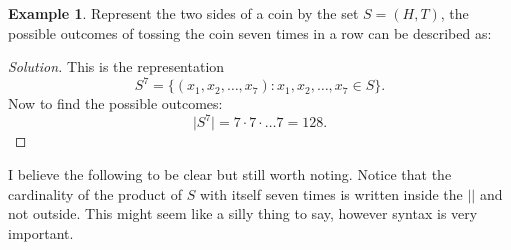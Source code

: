 \documentclass{article}
\theoremstyle{definition}
\newtheorem{example}{Example}[subsection]
\newenvironment{solution}
    {\begin{proof}[Solution]}
    {\end{proof}}
\begin{document}
\begin{example}
    Represent the two sides of a coin by the set $S=(H,T)$, the possible outcomes of tossing the coin seven times in a row can be described as: 
    \begin{solution}
        This is the representation
        $$
        S^7=\{(x_1,x_2,\dots,x_7): x_1,x_2,\dots,x_7 \in S\}.
        $$
        Now to find the possible outcomes: 
        $$
        \lvert S^7 \rvert = 7 \cdot 7 \cdot \dots 7= 128.
        $$
    \end{solution}
\end{example}
I believe the following to be clear but still worth noting. Notice that the cardinality of the product of $S$ with itself seven times is written inside the $\lvert  \rvert$ and not outside. This might seem like a silly thing to say, however syntax is very important. 
\end{document}
